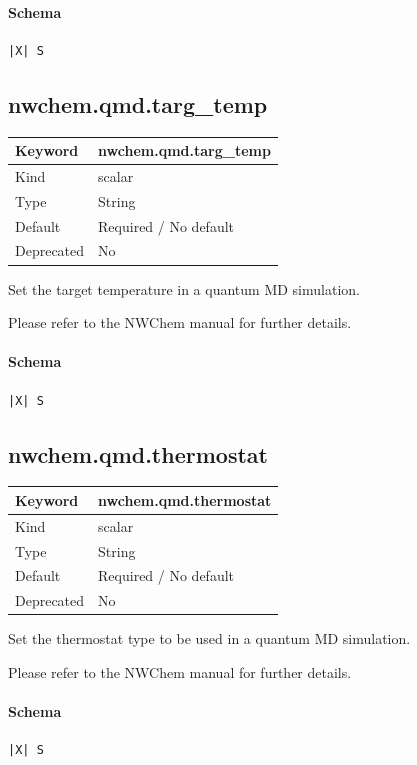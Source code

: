 \documentclass[11pt]{article}
\begin{document}
\paragraph{Schema}
\begin{Verbatim}
|X| S
\end{Verbatim}

\subsection{nwchem.qmd.targ\_temp}
\label{kw:nwchem-qmd-targ-temp}
\begin{longtable}{|p{1.5in}|p{4.5in}|}
\hline
Keyword & nwchem.qmd.targ\_temp \\
\hline
Kind & scalar \\
\hline
Type & String \\
\hline
Default & Required / No default \\
\hline
Deprecated & No \\
\hline
\end{longtable}
 Set the target temperature in a quantum MD simulation.

 Please refer to the NWChem manual for further details.

\paragraph{Schema}
\begin{Verbatim}
|X| S
\end{Verbatim}

\subsection{nwchem.qmd.thermostat}
\label{kw:nwchem-qmd-thermostat}
\begin{longtable}{|p{1.5in}|p{4.5in}|}
\hline
Keyword & nwchem.qmd.thermostat \\
\hline
Kind & scalar \\
\hline
Type & String \\
\hline
Default & Required / No default \\
\hline
Deprecated & No \\
\hline
\end{longtable}
 Set the thermostat type to be used in a quantum MD simulation.

 Please refer to the NWChem manual for further details.

\paragraph{Schema}
\begin{Verbatim}
|X| S
\end{Verbatim}
\end{document}

